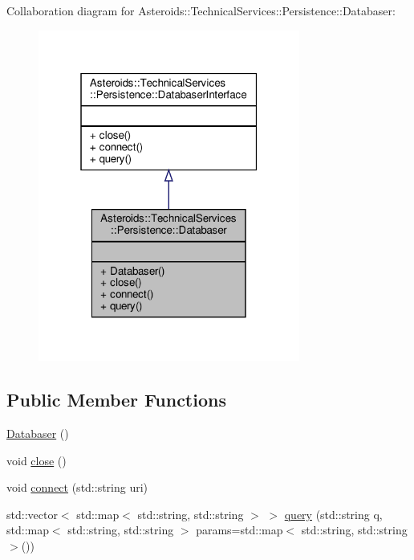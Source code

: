 Collaboration diagram for Asteroids\+:\+:Technical\+Services\+:\+:Persistence\+:\+:Databaser\+:\nopagebreak
\begin{figure}[H]
\begin{center}
\leavevmode
\includegraphics[width=244pt]{classAsteroids_1_1TechnicalServices_1_1Persistence_1_1Databaser__coll__graph}
\end{center}
\end{figure}
\subsection*{Public Member Functions}
\begin{DoxyCompactItemize}
\item 
\hyperlink{classAsteroids_1_1TechnicalServices_1_1Persistence_1_1Databaser_a4f24b61aea606c9f76e8f568b6fa3761}{Databaser} ()
\item 
void \hyperlink{classAsteroids_1_1TechnicalServices_1_1Persistence_1_1Databaser_a53cd8a3f467fc3c8284711eccbb25d8e}{close} ()
\item 
void \hyperlink{classAsteroids_1_1TechnicalServices_1_1Persistence_1_1Databaser_aa7dc4f3b86f7966260d6f5d391d4a3ba}{connect} (std\+::string uri)
\item 
std\+::vector$<$ std\+::map$<$ std\+::string, std\+::string $>$ $>$ \hyperlink{classAsteroids_1_1TechnicalServices_1_1Persistence_1_1Databaser_a0686831c03a3eabced8649a2e189fef1}{query} (std\+::string q, std\+::map$<$ std\+::string, std\+::string $>$ params=std\+::map$<$ std\+::string, std\+::string $>$())
\end{DoxyCompactItemize}


